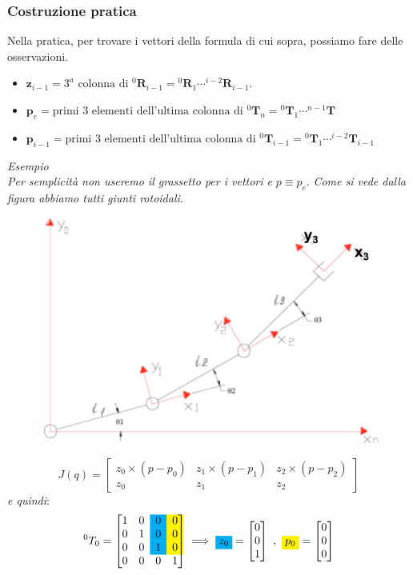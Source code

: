 \vspace*{25pt}
\subsubsection{Costruzione pratica}
Nella pratica, per trovare i vettori della formula di cui sopra, possiamo fare delle osservazioni.

\begin{itemize}
	\item $\bm{z}_{i-1} = 3^{a} \text{ colonna di } {}^0\bm{R}_{i-1} = {}^0\bm{R}_{1} \cdots {}^{i-2}\bm{R}_{i-1}$.
	\item $\bm{p}_e = \text{primi 3 elementi dell'ultima colonna di } {}^0\bm{T}_n = {}^0\bm{T}_{1} \cdots {}^{n-1}\bm{T}_{}$
	\item $\bm{p}_{i-1} = \text{primi 3 elementi dell'ultima colonna di } {}^0\bm{T}_{i-1} = {}^0\bm{T}_{1} \cdots {}^{i-2}\bm{T}_{i-1}$
\end{itemize}

\vspace*{10pt}
\textit{Esempio}\\
\textit{Per semplicità non useremo il grassetto per i vettori e} $p \equiv p_e$. \textit{Come si vede dalla figura abbiamo tutti giunti rotoidali.}
\begin{figure}[H]
	\centering
	\includegraphics[width=0.4\linewidth]{images/diff_kine_3}
	\label{fig:diffkine3}
\end{figure}
$$
J(q)
=
\begin{bmatrix*}
z_0 \times (p - p_0) & z_1 \times (p - p_1) & z_2 \times (p - p_2) \\
z_0 & z_1 & z_2
\end{bmatrix*}
$$
\textit{e quindi}:
\begin{equation*}  
	{}^0T_0
	=
	\begin{bmatrix}
		1 & 0 & \cellcolor{cyan}0 & \cellcolor{yellow}0 \\
		0 & 1 & \cellcolor{cyan}0 & \cellcolor{yellow}0 \\
		0 & 0 & \cellcolor{cyan}1 & \cellcolor{yellow}0 \\
		0 & 0 & 0 & 1 \\
	\end{bmatrix}
	\implies
	\colorbox{cyan}{$z_0$}
	=
	\begin{bmatrix}
		0 \\ 0 \\ 1
	\end{bmatrix}
	\ , \
	\colorbox{yellow}{$p_0$}
	=
	\begin{bmatrix}
		0 \\ 0 \\ 0
	\end{bmatrix}
\end{equation*}

